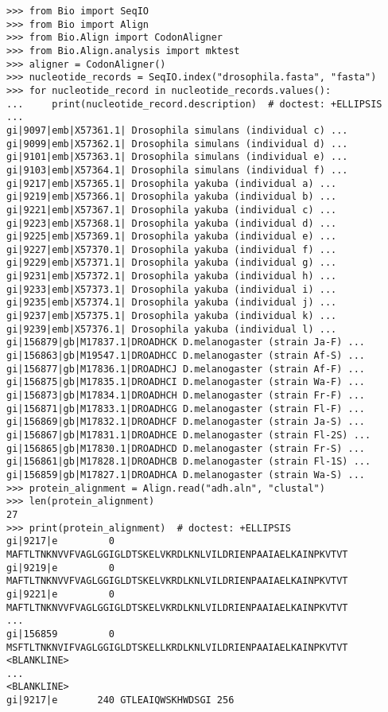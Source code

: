 \begin{verbatim}
>>> from Bio import SeqIO
>>> from Bio import Align
>>> from Bio.Align import CodonAligner
>>> from Bio.Align.analysis import mktest
>>> aligner = CodonAligner()
>>> nucleotide_records = SeqIO.index("drosophila.fasta", "fasta")
>>> for nucleotide_record in nucleotide_records.values():
...     print(nucleotide_record.description)  # doctest: +ELLIPSIS
...
gi|9097|emb|X57361.1| Drosophila simulans (individual c) ...
gi|9099|emb|X57362.1| Drosophila simulans (individual d) ...
gi|9101|emb|X57363.1| Drosophila simulans (individual e) ...
gi|9103|emb|X57364.1| Drosophila simulans (individual f) ...
gi|9217|emb|X57365.1| Drosophila yakuba (individual a) ...
gi|9219|emb|X57366.1| Drosophila yakuba (individual b) ...
gi|9221|emb|X57367.1| Drosophila yakuba (individual c) ...
gi|9223|emb|X57368.1| Drosophila yakuba (individual d) ...
gi|9225|emb|X57369.1| Drosophila yakuba (individual e) ...
gi|9227|emb|X57370.1| Drosophila yakuba (individual f) ...
gi|9229|emb|X57371.1| Drosophila yakuba (individual g) ...
gi|9231|emb|X57372.1| Drosophila yakuba (individual h) ...
gi|9233|emb|X57373.1| Drosophila yakuba (individual i) ...
gi|9235|emb|X57374.1| Drosophila yakuba (individual j) ...
gi|9237|emb|X57375.1| Drosophila yakuba (individual k) ...
gi|9239|emb|X57376.1| Drosophila yakuba (individual l) ...
gi|156879|gb|M17837.1|DROADHCK D.melanogaster (strain Ja-F) ...
gi|156863|gb|M19547.1|DROADHCC D.melanogaster (strain Af-S) ...
gi|156877|gb|M17836.1|DROADHCJ D.melanogaster (strain Af-F) ...
gi|156875|gb|M17835.1|DROADHCI D.melanogaster (strain Wa-F) ...
gi|156873|gb|M17834.1|DROADHCH D.melanogaster (strain Fr-F) ...
gi|156871|gb|M17833.1|DROADHCG D.melanogaster (strain Fl-F) ...
gi|156869|gb|M17832.1|DROADHCF D.melanogaster (strain Ja-S) ...
gi|156867|gb|M17831.1|DROADHCE D.melanogaster (strain Fl-2S) ...
gi|156865|gb|M17830.1|DROADHCD D.melanogaster (strain Fr-S) ...
gi|156861|gb|M17828.1|DROADHCB D.melanogaster (strain Fl-1S) ...
gi|156859|gb|M17827.1|DROADHCA D.melanogaster (strain Wa-S) ...
>>> protein_alignment = Align.read("adh.aln", "clustal")
>>> len(protein_alignment)
27
>>> print(protein_alignment)  # doctest: +ELLIPSIS
gi|9217|e         0 MAFTLTNKNVVFVAGLGGIGLDTSKELVKRDLKNLVILDRIENPAAIAELKAINPKVTVT
gi|9219|e         0 MAFTLTNKNVVFVAGLGGIGLDTSKELVKRDLKNLVILDRIENPAAIAELKAINPKVTVT
gi|9221|e         0 MAFTLTNKNVVFVAGLGGIGLDTSKELVKRDLKNLVILDRIENPAAIAELKAINPKVTVT
...
gi|156859         0 MSFTLTNKNVIFVAGLGGIGLDTSKELLKRDLKNLVILDRIENPAAIAELKAINPKVTVT
<BLANKLINE>
...
<BLANKLINE>
gi|9217|e       240 GTLEAIQWSKHWDSGI 256

\end{verbatim}
